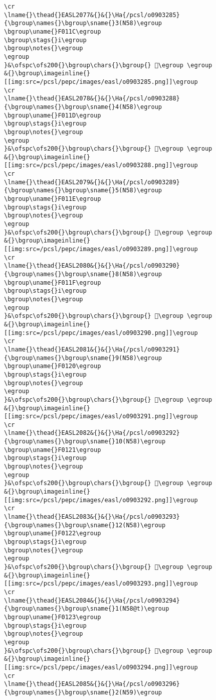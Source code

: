 \begin{verbatim}
\cr
\lname{}\thead{}EASL2077&{}&{}\Ha{/pcsl/o0903285}{\bgroup\names{}\bgroup\sname{}3(N58)\egroup
\bgroup\uname{}F011C\egroup
\bgroup\stags{}i\egroup
\bgroup\notes{}\egroup
\egroup
}&\ofspc\ofs200{}\bgroup\chars{}\bgroup{} 󰄜\egroup \egroup
&{}\bgroup\imageinline{}[[img:src=/pcsl/pepc/images/easl/o0903285.png]]\egroup
\cr
\lname{}\thead{}EASL2078&{}&{}\Ha{/pcsl/o0903288}{\bgroup\names{}\bgroup\sname{}4(N58)\egroup
\bgroup\uname{}F011D\egroup
\bgroup\stags{}i\egroup
\bgroup\notes{}\egroup
\egroup
}&\ofspc\ofs200{}\bgroup\chars{}\bgroup{} 󰄝\egroup \egroup
&{}\bgroup\imageinline{}[[img:src=/pcsl/pepc/images/easl/o0903288.png]]\egroup
\cr
\lname{}\thead{}EASL2079&{}&{}\Ha{/pcsl/o0903289}{\bgroup\names{}\bgroup\sname{}5(N58)\egroup
\bgroup\uname{}F011E\egroup
\bgroup\stags{}i\egroup
\bgroup\notes{}\egroup
\egroup
}&\ofspc\ofs200{}\bgroup\chars{}\bgroup{} 󰄞\egroup \egroup
&{}\bgroup\imageinline{}[[img:src=/pcsl/pepc/images/easl/o0903289.png]]\egroup
\cr
\lname{}\thead{}EASL2080&{}&{}\Ha{/pcsl/o0903290}{\bgroup\names{}\bgroup\sname{}8(N58)\egroup
\bgroup\uname{}F011F\egroup
\bgroup\stags{}i\egroup
\bgroup\notes{}\egroup
\egroup
}&\ofspc\ofs200{}\bgroup\chars{}\bgroup{} 󰄟\egroup \egroup
&{}\bgroup\imageinline{}[[img:src=/pcsl/pepc/images/easl/o0903290.png]]\egroup
\cr
\lname{}\thead{}EASL2081&{}&{}\Ha{/pcsl/o0903291}{\bgroup\names{}\bgroup\sname{}9(N58)\egroup
\bgroup\uname{}F0120\egroup
\bgroup\stags{}i\egroup
\bgroup\notes{}\egroup
\egroup
}&\ofspc\ofs200{}\bgroup\chars{}\bgroup{} 󰄠\egroup \egroup
&{}\bgroup\imageinline{}[[img:src=/pcsl/pepc/images/easl/o0903291.png]]\egroup
\cr
\lname{}\thead{}EASL2082&{}&{}\Ha{/pcsl/o0903292}{\bgroup\names{}\bgroup\sname{}10(N58)\egroup
\bgroup\uname{}F0121\egroup
\bgroup\stags{}i\egroup
\bgroup\notes{}\egroup
\egroup
}&\ofspc\ofs200{}\bgroup\chars{}\bgroup{} 󰄡\egroup \egroup
&{}\bgroup\imageinline{}[[img:src=/pcsl/pepc/images/easl/o0903292.png]]\egroup
\cr
\lname{}\thead{}EASL2083&{}&{}\Ha{/pcsl/o0903293}{\bgroup\names{}\bgroup\sname{}12(N58)\egroup
\bgroup\uname{}F0122\egroup
\bgroup\stags{}i\egroup
\bgroup\notes{}\egroup
\egroup
}&\ofspc\ofs200{}\bgroup\chars{}\bgroup{} 󰄢\egroup \egroup
&{}\bgroup\imageinline{}[[img:src=/pcsl/pepc/images/easl/o0903293.png]]\egroup
\cr
\lname{}\thead{}EASL2084&{}&{}\Ha{/pcsl/o0903294}{\bgroup\names{}\bgroup\sname{}1(N58@t)\egroup
\bgroup\uname{}F0123\egroup
\bgroup\stags{}i\egroup
\bgroup\notes{}\egroup
\egroup
}&\ofspc\ofs200{}\bgroup\chars{}\bgroup{} 󰄣\egroup \egroup
&{}\bgroup\imageinline{}[[img:src=/pcsl/pepc/images/easl/o0903294.png]]\egroup
\cr
\lname{}\thead{}EASL2085&{}&{}\Ha{/pcsl/o0903296}{\bgroup\names{}\bgroup\sname{}2(N59)\egroup

\end{verbatim}
